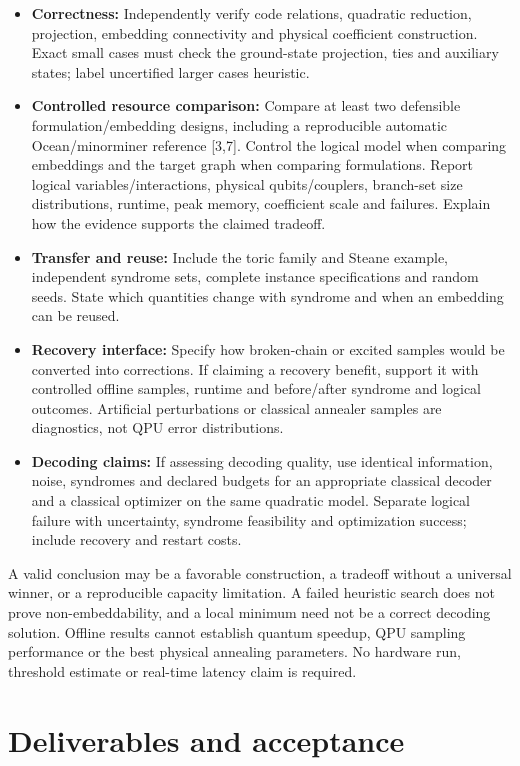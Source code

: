 \documentclass[11pt,letterpaper]{article}
\begin{document}
\begin{itemize}\item \textbf{Correctness:} Independently verify code relations, quadratic reduction, projection, embedding connectivity and physical coefficient construction. Exact small cases must check the ground-state projection, ties and auxiliary states; label uncertified larger cases heuristic.
\item \textbf{Controlled resource comparison:} Compare at least two defensible formulation/embedding designs, including a reproducible automatic Ocean/minorminer reference [3,7]. Control the logical model when comparing embeddings and the target graph when comparing formulations. Report logical variables/interactions, physical qubits/couplers, branch-set size distributions, runtime, peak memory, coefficient scale and failures. Explain how the evidence supports the claimed tradeoff.
\item \textbf{Transfer and reuse:} Include the toric family and Steane example, independent syndrome sets, complete instance specifications and random seeds. State which quantities change with syndrome and when an embedding can be reused.
\item \textbf{Recovery interface:} Specify how broken-chain or excited samples would be converted into corrections. If claiming a recovery benefit, support it with controlled offline samples, runtime and before/after syndrome and logical outcomes. Artificial perturbations or classical annealer samples are diagnostics, not QPU error distributions.
\item \textbf{Decoding claims:} If assessing decoding quality, use identical information, noise, syndromes and declared budgets for an appropriate classical decoder and a classical optimizer on the same quadratic model. Separate logical failure with uncertainty, syndrome feasibility and optimization success; include recovery and restart costs.\end{itemize}

A valid conclusion may be a favorable construction, a tradeoff without a universal winner, or a reproducible capacity limitation. A failed heuristic search does not prove non-embeddability, and a local minimum need not be a correct decoding solution. Offline results cannot establish quantum speedup, QPU sampling performance or the best physical annealing parameters. No hardware run, threshold estimate or real-time latency claim is required.\par

\section{Deliverables and acceptance}
\end{document}
